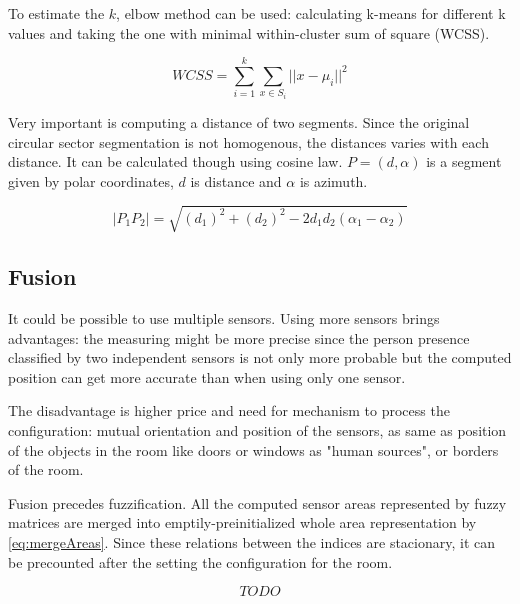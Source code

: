 
To estimate the $k$, elbow method can be used: calculating k-means for different k values and taking the one with
minimal within-cluster sum of square (WCSS).\cite{ClusterAnalysis} \cite{VagueNatureInformation}

\begin{equation}
\mathit{WCSS} = \sum_{i=1}^{k} \sum_{x \in S_i} ||x - \mu_i||^2
\end{equation}

Very important is computing a distance of two segments. Since the original circular sector segmentation
is not homogenous, the distances varies with each distance. It can be calculated though using
cosine law. $P = (d, \alpha)$ is a segment given by polar coordinates, $d$ is distance and $\alpha$ is
azimuth.

\begin{equation}
|P_{1} P_{2}| = \sqrt{(d_{1})^{2} + (d_{2})^{2} - 2d_{1}d_{2}(\alpha_1 - \alpha_2)}
\end{equation}

\subsection*{Fusion}
It could be possible to use multiple sensors. Using more sensors brings advantages: the measuring
might be more precise since the person presence classified by two independent sensors is not only
more probable but the computed position can get more accurate than when using only one sensor.

The disadvantage is higher price and need for mechanism to process the configuration: mutual
orientation and position of the sensors, as same as position of the objects in the room
like doors or windows as "human sources", or borders of the room.

Fusion precedes fuzzification. All the computed sensor areas represented by fuzzy matrices
are merged into emptily-preinitialized whole area representation by \ref{eq:mergeAreas}.
Since these relations between the indices are stacionary, it can be precounted after the
setting the configuration for the room.

\begin{subequations}
\begin{equation}
TODO
\end{equation}
\label{eq:mergeAreas}
\end{subequations}




